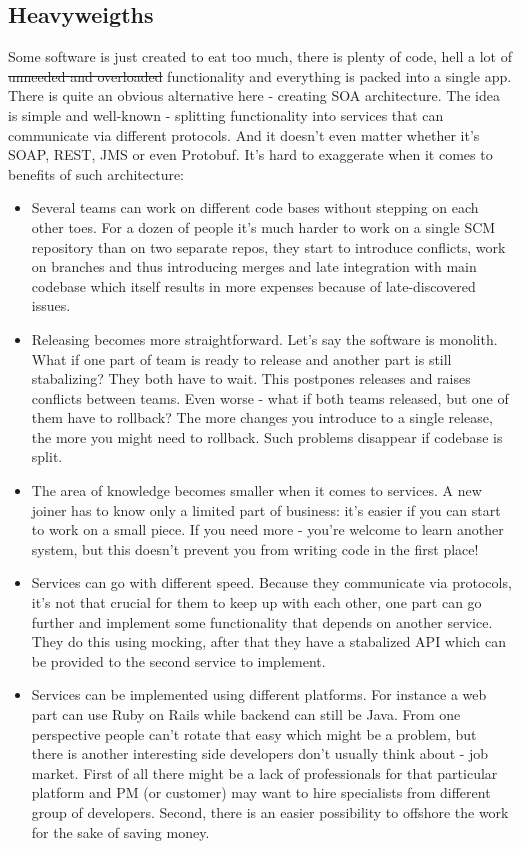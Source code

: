 \subsection{Heavyweigths}
Some software is just created to eat too much, there is plenty of code, hell a lot of \sout{unneeded and overloaded} functionality and everything is packed into a single app. There is quite an obvious alternative here - creating SOA architecture. The idea is simple and well-known - splitting functionality into services that can communicate via different protocols. And it doesn't even matter whether it's SOAP, REST, JMS or even Protobuf. It's hard to exaggerate when it comes to benefits of such architecture:
\begin{itemize}
  \item Several teams can work on different code bases without stepping on each other toes. For a dozen of people it's much harder to work on a single SCM repository than on two separate repos, they start to introduce conflicts, work on branches and thus introducing merges and late integration with main codebase which itself results in more expenses because of late-discovered issues.
  \item Releasing becomes more straightforward. Let's say the software is monolith. What if one part of team is ready to release and another part is still stabalizing? They both have to wait. This postpones releases and raises conflicts between teams. Even worse - what if both teams released, but one of them have to rollback? The more changes you introduce to a single release, the more you might need to rollback. Such problems disappear if codebase is split.
  \item The area of knowledge becomes smaller when it comes to services. A new joiner has to know only a limited part of business: it's easier if you can start to work on a small piece. If you need more - you're welcome to learn another system, but this doesn't prevent you from writing code in the first place!
  \item Services can go with different speed. Because they communicate via protocols, it's not that crucial for them to keep up with each other, one part can go further and implement some functionality that depends on another service. They do this using mocking, after that they have a stabalized API which can be provided to the second service to implement.
  \item Services can be implemented using different platforms. For instance a web part can use Ruby on Rails while backend can still be Java. From one perspective people can't rotate that easy which might be a problem, but there is another interesting side developers don't usually think about - job market. First of all there might be a lack of professionals for that particular platform and PM (or customer) may want to hire specialists from different group of developers. Second, there is an easier possibility to offshore the work for the sake of saving money.

\end{itemize}

